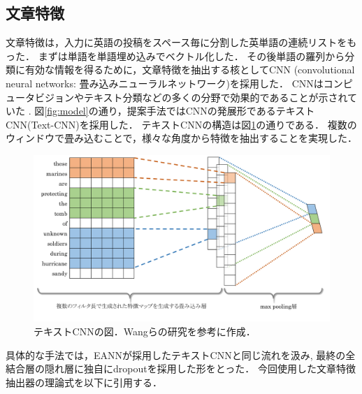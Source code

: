 \subsection{文章特徴} \label{subsec:text}
文章特徴は，入力に英語の投稿をスペース毎に分割した英単語の連続リストをもった．
まずは単語を単語埋め込みでベクトル化した．
その後単語の羅列から分類に有効な情報を得るために，文章特徴を抽出する核としてCNN
(convolutional neural networks: 畳み込みニューラルネットワーク)を採用した．
CNNはコンピュータビジョンやテキスト分類などの多くの分野で効果的であることが示されていた
\cite{collobert2011natural,KalchbrennerACL2014}.
図\ref{fig:model}の通り，提案手法ではCNNの発展形であるテキストCNN(Text-CNN)\cite{DBLP:journals/corr/Kim14f}を採用した．
テキストCNNの構造は図\ref{fig:text-cnn}の通りである．
複数のウィンドウで畳み込むことで，様々な角度から特徴を抽出することを実現した．
\begin{figure}[H]
    \centering
    \includegraphics[width=\linewidth]{images/text-cnn.pdf}
    \caption{テキストCNNの図．Wangらの研究\cite{Wang:2018:EEA:3219819.3219903}を参考に作成．}
    \label{fig:text-cnn}
\end{figure}

具体的な手法では，EANNが採用したテキストCNNと同じ流れを汲み\cite{Wang:2018:EEA:3219819.3219903},
最終の全結合層の隠れ層に独自にdropoutを採用した形をとった．
今回使用した文章特徴抽出器の理論式を以下に引用する．

